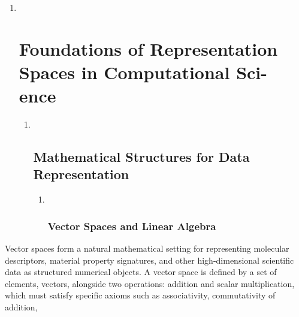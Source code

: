\documentclass[
]{article}
\begin{document}
\begin{enumerate}
\def\labelenumi{\arabic{enumi}.}
\setcounter{enumi}{1}
\item ~
  \hypertarget{foundations-of-representation-spaces-in-computational-sci--ence}{%
  \section{Foundations of Representation Spaces in Computational Sci-
  ence}\label{foundations-of-representation-spaces-in-computational-sci--ence}}

  \begin{enumerate}
  \def\labelenumii{\arabic{enumii}.}
  \item ~
    \hypertarget{mathematical-structures-for-data-representation}{%
    \subsection{Mathematical Structures for Data
    Representation}\label{mathematical-structures-for-data-representation}}

    \begin{enumerate}
    \def\labelenumiii{\arabic{enumiii}.}
    \item ~
      \hypertarget{vector-spaces-and-linear-algebra}{%
      \subsubsection{Vector Spaces and Linear
      Algebra}\label{vector-spaces-and-linear-algebra}}
    \end{enumerate}
  \end{enumerate}
\end{enumerate}

Vector spaces form a natural mathematical setting for representing
molecular descriptors, material property signatures, and other
high-dimensional scientific data as structured numerical objects. A
vector space is defined by a set of elements, vectors, alongside two
operations: addition and scalar multiplication, which must satisfy
specific axioms such as associativity, commutativity of addition,
\end{document}
